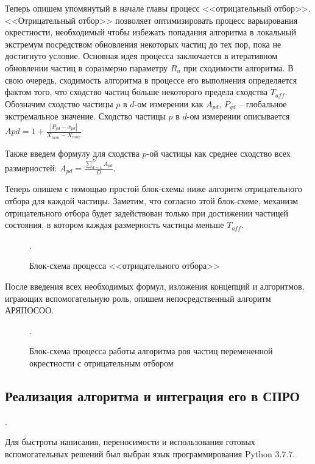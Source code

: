 Теперь опишем упомянутый в начале главы процесс <<отрицательный отбор>>. <<Отрицательный отбор>> позволяет оптимизировать процесс варьирования окрестности, необходимый чтобы избежать попадания алгоритма в локальный экстремум посредством  обновления некоторых частиц до тех пор, пока не достигнуто условие. Основная идея процесса заключается в итеративном обновлении частиц в соразмерно параметру $R_u$ при сходимости алгоритма. В свою очередь, сходимость алгоритма в процессе его выполнения определяется фактом того, что сходство частиц больше некоторого предела сходства $T_{aff}$. Обозначим сходство частицы $p$ в $d$-ом измерении как $A_{pd}$, $P_{gd}$ -- глобальное экстремальное значение.  %
Сходство частицы $p$ в $d$-ом измерении описывается $A{pd} = 1 + \frac{|P_{gd} - x_{pd}|}{X_{min} - X_{max}}$

Также введем формулу для сходства $p$-ой частицы как среднее сходство всех размерностей: $A_{pd} =  \frac {\sum_{d=1}^{D} A_{pd}} {D}$.

Теперь опишем с помощью простой блок-схемы ниже алгоритм отрицательного отбора для каждой частицы. Заметим, что согласно этой блок-схеме, механизм отрицательного отбора будет задействован только при достижении частицей состояния, в котором  каждая  размерность частицы меньше $T_{aff}$.


\begin{figure*}[h!]
	\caption{Блок-схема процесса <<отрицательного отбора>>}.
\end{figure*} 

После введения всех необходимых формул, изложения концепций и алгоритмов, играющих вспомогательную роль, опишем непосредственный алгоритм АРЯПОСОО. 

\begin{figure*}
	\caption{Блок-схема процесса работы алгоритма роя частиц перемененной окрестности с отрицательным отбором}.
\end{figure*} 

\newpage 

\subsection{Реализация алгоритма и интеграция его в СПРО}.

Для быстроты написания, переносимости и использования готовых вспомогательных решений был выбран язык программирования Python 3.7.7. 

